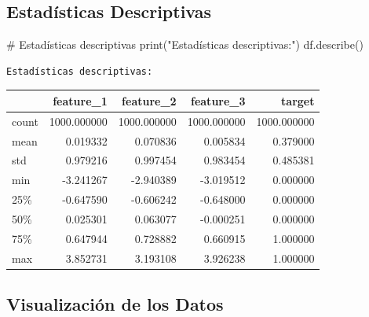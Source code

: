 \documentclass[
]{article}
\newenvironment{Shaded}{\begin{snugshade}}{\end{snugshade}}
\newcommand{\BuiltInTok}[1]{\textcolor[rgb]{0.00,0.23,0.31}{#1}}
\newcommand{\CommentTok}[1]{\textcolor[rgb]{0.37,0.37,0.37}{#1}}
\newcommand{\NormalTok}[1]{\textcolor[rgb]{0.00,0.23,0.31}{#1}}
\newcommand{\StringTok}[1]{\textcolor[rgb]{0.13,0.47,0.30}{#1}}
\begin{document}
\subsection{Estadísticas
Descriptivas}\label{estaduxedsticas-descriptivas}

\begin{Shaded}
\begin{Highlighting}[]
\CommentTok{\# Estadísticas descriptivas}
\BuiltInTok{print}\NormalTok{(}\StringTok{"Estadísticas descriptivas:"}\NormalTok{)}
\NormalTok{df.describe()}
\end{Highlighting}
\end{Shaded}

\begin{verbatim}
Estadísticas descriptivas:
\end{verbatim}

\label{describe-data}
\begin{tabular}{lrrrr}
\toprule
{} &    feature\_1 &    feature\_2 &    feature\_3 &       target \\
\midrule
count &  1000.000000 &  1000.000000 &  1000.000000 &  1000.000000 \\
mean  &     0.019332 &     0.070836 &     0.005834 &     0.379000 \\
std   &     0.979216 &     0.997454 &     0.983454 &     0.485381 \\
min   &    -3.241267 &    -2.940389 &    -3.019512 &     0.000000 \\
25\%   &    -0.647590 &    -0.606242 &    -0.648000 &     0.000000 \\
50\%   &     0.025301 &     0.063077 &    -0.000251 &     0.000000 \\
75\%   &     0.647944 &     0.728882 &     0.660915 &     1.000000 \\
max   &     3.852731 &     3.193108 &     3.926238 &     1.000000 \\
\bottomrule
\end{tabular}

\subsection{Visualización de los
Datos}\label{visualizaciuxf3n-de-los-datos}
\end{document}
